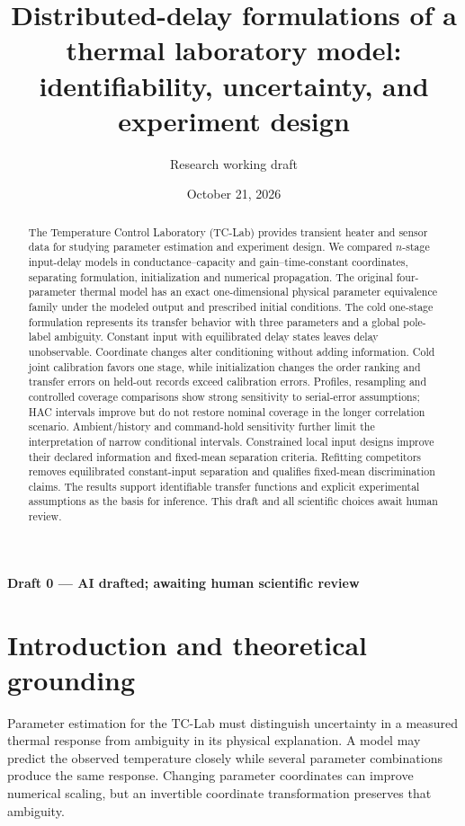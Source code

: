 \documentclass[11pt]{article}
\title{Distributed-delay formulations of a thermal laboratory model:\\
identifiability, uncertainty, and experiment design}
\author{Research working draft}
\date{October 21, 2026}
\newcommand{\draftstatus}{Draft 0 --- AI drafted; awaiting human scientific review}
\begin{document}
\maketitle
\begin{center}\small\textbf{\draftstatus}\end{center}
\begin{abstract}

The Temperature Control Laboratory (TC-Lab) provides transient heater and sensor
data for studying parameter estimation and experiment design. We compared
$n$-stage input-delay models in conductance--capacity and gain--time-constant
coordinates, separating formulation, initialization and numerical propagation.
The original four-parameter thermal model has an exact one-dimensional physical
parameter equivalence family under the modeled output and prescribed initial
conditions. The cold one-stage formulation represents its transfer behavior
with three parameters and a global pole-label ambiguity. Constant input with
equilibrated delay states leaves delay unobservable. Coordinate changes alter
conditioning without adding information. Cold joint calibration favors one
stage, while initialization changes the order ranking and transfer errors on
held-out records exceed calibration errors. Profiles, resampling and controlled
coverage comparisons show strong sensitivity to serial-error assumptions;
HAC intervals improve but do not restore nominal coverage in the longer
correlation scenario. Ambient/history and command-hold sensitivity further
limit the interpretation of narrow conditional intervals. Constrained local
input designs improve their declared information and fixed-mean separation
criteria. Refitting competitors removes equilibrated constant-input separation
and qualifies fixed-mean discrimination claims. The results support
identifiable transfer functions and explicit experimental assumptions as the
basis for inference. This draft and all scientific choices await human review.


\end{abstract}

\section{Introduction and theoretical grounding}
Parameter estimation for the TC-Lab must distinguish uncertainty in a measured
thermal response from ambiguity in its physical explanation. A model may predict
the observed temperature closely while several parameter combinations produce
the same response. Changing parameter coordinates can improve numerical scaling,
but an invertible coordinate transformation preserves that ambiguity.
\end{document}
